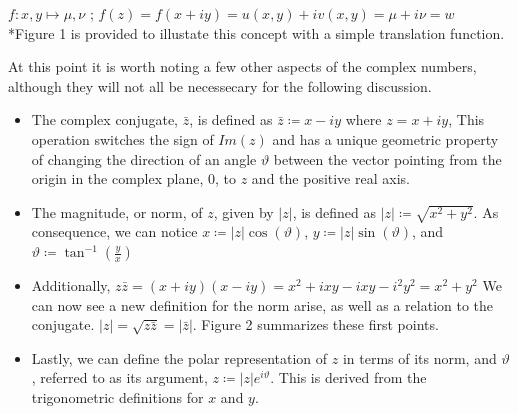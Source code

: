 \documentclass[a4paper,man,natbib]{apa6}
\begin{document}
\begin{center}

      $ f : x,y \mapsto \mu,\nu $ ; $ f(z) = f(x+iy) = u(x,y) + iv(x,y) = \mu + i\nu = w $ \\
     *Figure 1 is provided to illustate this concept with a simple translation function.

\end{center}

At this point it is worth noting a few other aspects of the complex numbers, although they will not all be necessecary for the following discussion.

\begin{itemize}

\item The complex conjugate, $ \bar{z} $, is defined as $ \bar{z} \coloneqq x - iy $ where $ z = x +iy $,
This operation switches the sign of $ Im(z) $ and has a unique geometric property of changing the direction of an angle $ \vartheta $
between the vector pointing from the origin in the complex plane, 0, to $z$ and the positive real axis.

\item The magnitude, or norm, of $ z $, given by $ |z| $, is defined as $ |z| \coloneqq \sqrt{x^2 + y^2} $.
As consequence, we can notice $ x \coloneqq  |z|\cos(\vartheta) $, $ y \coloneqq  |z|\sin(\vartheta) $, and $ \vartheta \coloneqq  \tan^{-1}(\frac{y}{x}) $

\item Additionally, $ z\bar{z} = (x + iy)(x - iy) = x^2 +ixy - ixy - i^2y^2 = x^2 + y^2$  We can now see a new definition for the norm arise, as well as a relation to the conjugate.
$ |z| = \sqrt{z\bar{z}} = |\bar{z}| $. Figure 2 summarizes these first points.

\item Lastly, we can define the polar representation of $ z $ in terms of its norm, and $\vartheta$, referred to as its argument,  $ z \coloneqq  |z|e^{i\vartheta} $. This is derived from the trigonometric definitions for $ x $ and $ y $.

\end{itemize}
\end{document}
